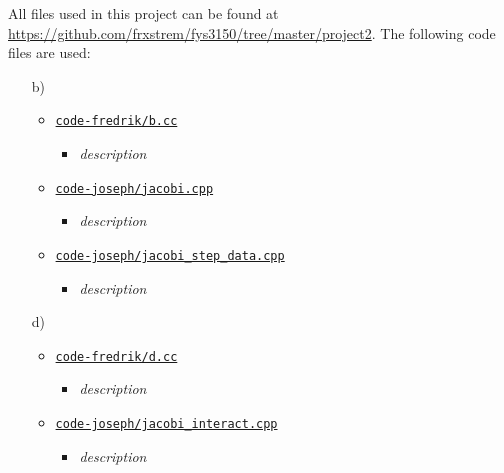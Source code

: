 \documentclass[11pt,a4paper]{article}
\begin{document}
All files used in this project can be found at \url{https://github.com/frxstrem/fys3150/tree/master/project2}.
The following code files are used:
\begin{enumerate}
  \item[b)]
  \begin{itemize}
    \item \href{https://github.com/frxstrem/fys3150/tree/master/project2/code-fredrik/b.cc}{\tt code-fredrik/b.cc}
    \begin{itemize}
      \item {\it description}
    \end{itemize}
    \item \href{https://github.com/frxstrem/fys3150/tree/master/project2/code-joseph/jacobi.cpp}{\tt code-joseph/jacobi.cpp}
    \begin{itemize}
      \item {\it description}
    \end{itemize}
    \item \href{https://github.com/frxstrem/fys3150/tree/master/project2/code-joseph/jacobi_step_data.cpp}{\tt code-joseph/jacobi\_step\_data.cpp}
    \begin{itemize}
      \item {\it description}
    \end{itemize}
  \end{itemize}

  \item[d)]
  \begin{itemize}
    \item \href{https://github.com/frxstrem/fys3150/tree/master/project2/code-fredrik/d.cc}{\tt code-fredrik/d.cc}
    \begin{itemize}
      \item {\it description}
    \end{itemize}
    \item \href{https://github.com/frxstrem/fys3150/tree/master/project2/code-joseph/jacobi_interact.cpp}{\tt code-joseph/jacobi\_interact.cpp}
    \begin{itemize}
      \item {\it description}
    \end{itemize}
  \end{itemize}
\end{enumerate}

\clearpage

\printbibliography[heading=bibnumbered,title=Bibliography]
\end{document}
